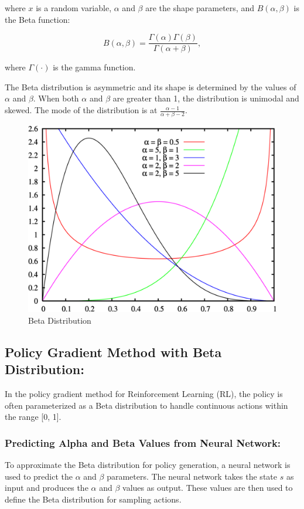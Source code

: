 where $x$ is a random variable, $\alpha$ and $\beta$ are the shape parameters, and $B(\alpha, \beta)$ is the Beta function:

\begin{equation}
    B(\alpha, \beta) = \frac{\Gamma(\alpha) \Gamma(\beta)}{\Gamma(\alpha + \beta)},\label{eq:equation3}
\end{equation}

where $\Gamma(\cdot)$ is the gamma function.

The Beta distribution is asymmetric and its shape is determined by the values of $\alpha$ and $\beta$. When both $\alpha$ and $\beta$ are greater than 1, the distribution is unimodal and skewed.
The mode of the distribution is at $\frac{\alpha - 1}{\alpha + \beta - 2}$.

\begin{figure}[h!]
    \centering
    \includegraphics[width=12cm]{assets/beta}
    \caption{Beta Distribution}\label{fig:figure2}
\end{figure}

\subsection*{Policy Gradient Method with Beta Distribution:}
In the policy gradient method for Reinforcement Learning (RL), the policy is often parameterized as a Beta distribution to handle continuous actions within the range [0, 1].

\subsubsection*{Predicting Alpha and Beta Values from Neural Network:}
To approximate the Beta distribution for policy generation, a neural network is used to predict the $\alpha$ and $\beta$ parameters.
The neural network takes the state $s$ as input and produces the $\alpha$ and $\beta$ values as output.
These values are then used to define the Beta distribution for sampling actions.

